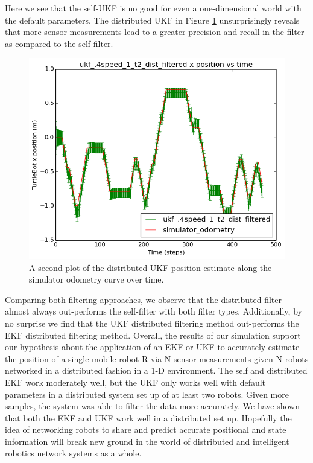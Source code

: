 \documentclass[conference]{IEEEtran} \usepackage[T1]{fontenc} \usepackage[backend=biber, style=ieee]{biblatex}
\begin{document}
Here we see that the self-UKF is no good for even a one-dimensional world with the default parameters.
The distributed UKF in Figure \ref{pic12} unsurprisingly reveals that more sensor measurements lead to a greater
precision and recall in the filter as compared to the self-filter. 

\begin{figure}
\centering 
\includegraphics[scale=.45]{ukf_4speed_1_t2_dist_filtered_pos_err_graph}
\caption {A second plot of the distributed UKF position estimate along the simulator odometry curve over time.}
\label{pic12} 
\end{figure}

Comparing both filtering approaches, we observe that the distributed filter almost always out-performs the self-filter 
with both filter types. Additionally, by no surprise we find that the UKF distributed filtering method out-performs the EKF distributed
filtering method. Overall, the results of our simulation support our hypothesis about the application of an EKF or UKF to accurately
estimate the position of a single mobile robot R via N sensor measurements given N robots networked in a distributed fashion in a 1-D environment. 
The self and distributed EKF work moderately well, but the UKF only works well with default parameters in a distributed system set up of at least 
two robots. Given more samples, the system was able to filter the data more accurately. We have shown that both the EKF and UKF work well in a 
distributed set up. Hopefully the idea of networking robots to share and predict accurate positional and state information will break new ground in 
the world of distributed and intelligent robotics network systems as a whole.
\end{document}
